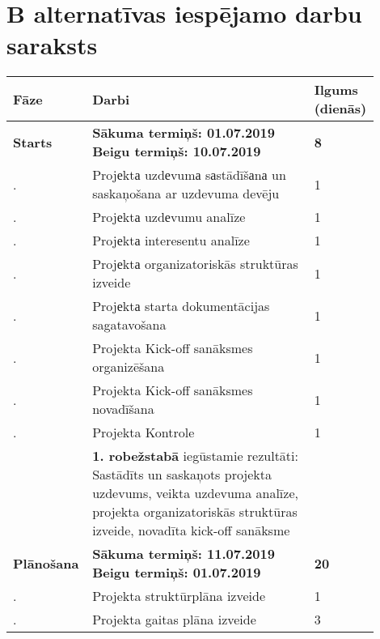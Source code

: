 \section{B alternatīvas iespējamo darbu saraksts}
\label{app:B_iespejamo_darbu_saraskts}
\newcommand\rownumber{\stepcounter{workCounter}\arabic{workCounter}.}

\begin{longtable}{|p{0.2\linewidth}|p{0.6\linewidth}|p{0.1\linewidth}|}
    \hline
        \textbf{Fāze} & \textbf{Darbi} & \textbf{Ilgums (dienās)} \\
    \hline
        \textbf{Starts} & 
        \textbf{Sākuma termiņš: 01.07.2019} \newline 
        \textbf{Beigu termiņš: 10.07.2019}  & 
        \textbf{8}
        \setcounter{workCounter}{0} \\
    \hline
        \rownumber & Projеktа uzdеvumа sаstādīšаnа un saskaņošana ar uzdevuma devēju & 1 \\
    \hline
        \rownumber & Projеktа uzdеvumu analīze & 1 \\
    \hline
        \rownumber & Projеktа interesentu analīze & 1 \\
    \hline
        \rownumber & Projеktа organizatoriskās struktūras izveide & 1 \\
    \hline
        \rownumber & Projеktа starta dokumentācijas sagatavošana & 1 \\
    \hline
        \rownumber & Projekta Kick-off sanāksmes organizēšana & 1 \\
    \hline
        \rownumber & Projekta Kick-off sanāksmes novadīšana & 1 \\
    \hline
        \rownumber & Projekta Kontrole & 1 \\
    \hline
        & \textbf{1. robežstabā} iegūstamie rezultāti: \newline 
        Sastādīts un saskaņots projekta uzdevums, veikta
        uzdevuma analīze, projekta organizatoriskās struktūras
        izveide, novadīta kick-off sanāksme & \\
    \hline
        \textbf{Plānošana} & 
        \textbf{Sākuma termiņš: 11.07.2019} \newline 
        \textbf{Beigu termiņš: 01.07.2019}  & 
        \textbf{20} 
        \setcounter{workCounter}{0} \\
    \hline
        \rownumber & Projekta struktūrplāna izveide & 1 \\
    \hline
        \rownumber & Projekta gaitas plāna izveide & 3 \\

\end{longtable}
